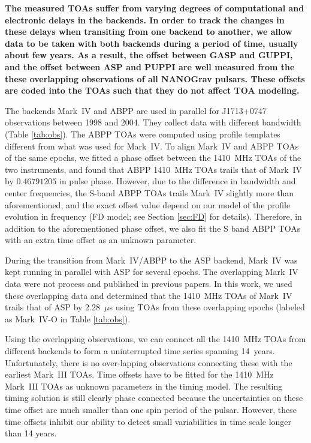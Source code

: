 {\bfref \bf
The measured TOAs suffer from varying degrees of computational
and electronic delays in the backends. 
In order to track the changes in these delays when transiting from
one backend to another, we allow data to be taken 
with both backends during a period of time, usually about few years.
As a result, the offset between GASP and GUPPI, and the offset between ASP and
PUPPI are well measured from the these overlapping observations of all NANOGrav
pulsars. These offsets are coded into the TOAs such that they do not affect
TOA modeling. 

The backends Mark~IV and ABPP are used in parallel for J1713+0747 
observations between 1998 and 2004. They collect data with different bandwidth (Table
\ref{tab:obs}). The ABPP TOAs were computed using
profile templates different from what was used for Mark~IV. 
To align Mark~IV and ABPP TOAs of the same epochs, we
fitted a phase offset between the 1410~MHz TOAs of the two instruments, and found
that ABPP 1410~MHz TOAs trails that of Mark~IV by $0.46791205$ in pulse phase.
However, due to the difference in bandwidth and center frequencies, the S-band
ABPP TOAs trails Mark~IV slightly more than aforementioned, and the exact
offset value depend on our model of the profile evolution in frequency (FD
model; see Section \ref{sec:FD} for details). Therefore, in
addition to the aforementioned phase offset, we also 
fit the S band ABPP TOAs with an extra time offset as an unknown parameter.

During the transition from Mark~IV/ABPP to the ASP backend, Mark~IV
was kept running in parallel with ASP for several epochs. 
The overlapping Mark~IV data were not process and published in previous papers. 
In this work, we used these overlapping data and determined that the 1410~MHz TOAs of
Mark~IV trails that of ASP by 2.28~$\mu$s using TOAs from these overlapping epochs 
(labeled as Mark~IV-O in Table \ref{tab:obs}). 

Using the overlapping observations, we can connect all the 1410~MHz TOAs from
different backends
to form a uninterrupted time series spanning 14~years. Unfortunately, there is no
over-lapping observations connecting these with the earliest  Mark~III TOAs. 
Time offsets have to be
fitted for the 1410~MHz Mark~III TOAs as unknown parameters in the timing
model. The resulting timing solution is still
clearly phase connected because the uncertainties on these time offset are
much
smaller than one spin period of the pulsar. However, these time offsets inhibit our
ability to detect small variabilities in time scale longer than 14 years.

}

